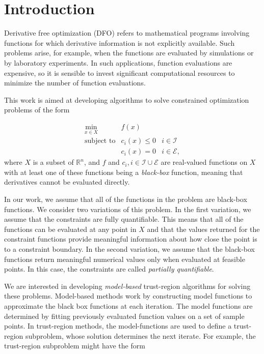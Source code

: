 \documentclass{article}
\newcommand{\domain}{X}
\newcommand{\real}{\mathbb R}
\begin{document}
\section{Introduction}

Derivative free optimization (DFO) refers to mathematical programs involving functions for which derivative information is not explicitly available.
Such problems arise, for example, when the functions are evaluated by simulations or by laboratory experiments.
In such applications, function evaluations are expensive, so it is sensible to invest significant computational resources to minimize the number of function evaluations.

This work is aimed at developing algorithms to solve constrained optimization problems of the form 

\[ \begin{array}{ccl} \min_{x \in \domain} & f(x) \\
\mbox{subject to} & c_i(x) \le 0 & i \in \mathcal{I} \\
& c_i(x) = 0 & i \in \mathcal{E},
\end{array}
\]
where $\domain$ is a subset of $\real^n$, and $f$ and $c_i, i \in \mathcal{I} \cup \mathcal{E}$ are real-valued functions on $X$ with at least one of these functions being a {\em black-box} function, meaning that derivatives cannot be evaluated directly.  

In our work, we assume that all of the functions in the problem are black-box functions.
We consider two variations of this problem.
In the first variation, we assume that the constraints are fully quantifiable.
This means that all of the functions can be evaluated at any point in $X$ and that the values returned for the constraint functions provide meaningful information about how close the point is to a constraint boundary.
In the second variation, we assume that the black-box functions return meaningful numerical values only when evaluated at feasible points. In this case, the constraints are called {\em partially quantifiable}.   



We are interested in developing {\em model-based} trust-region algorithms for solving these problems.
Model-based methods work by constructing model functions to approximate the black box functions at each iteration.
The model functions are determined by fitting previously evaluated function values on a set of sample points.
In trust-region methods, the model-functions are used to define a trust-region subproblem, whose solution determines the next iterate.
For example, the trust-region subproblem might have the form
\end{document}
